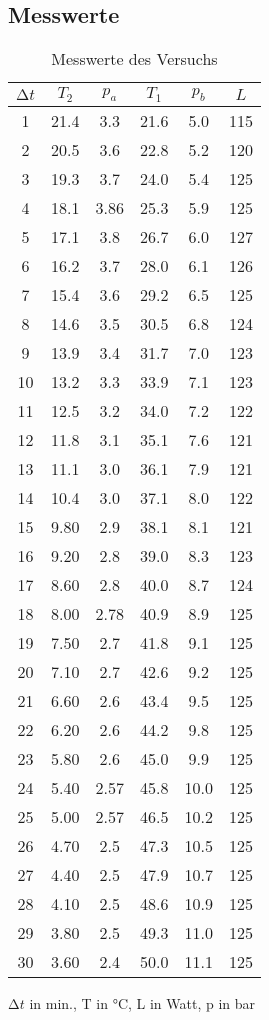 \newpage

\subsection{Messwerte}

\begin{table}
  \caption{Messwerte des Versuchs}
  \begin{tabular}{c c c c c c}
    \toprule $\increment t$ & $T_2$ & $p_a$ & $T_1$ & $p_b$ & $L$ \\
    \midrule
     1 & 21.4 & 3.3 & 21.6 & 5.0  & 115 \\
     2 & 20.5 & 3.6 & 22.8 & 5.2  & 120 \\
     3 & 19.3 & 3.7 & 24.0 & 5.4  & 125 \\
     4 & 18.1 & 3.86& 25.3 & 5.9  & 125 \\
     5 & 17.1 & 3.8 & 26.7 & 6.0  & 127 \\
     6 & 16.2 & 3.7 & 28.0 & 6.1  & 126 \\
     7 & 15.4 & 3.6 & 29.2 & 6.5  & 125 \\
     8 & 14.6 & 3.5 & 30.5 & 6.8  & 124 \\
     9 & 13.9 & 3.4 & 31.7 & 7.0  & 123 \\
    10 & 13.2 & 3.3 & 33.9 & 7.1  & 123 \\
    11 & 12.5 & 3.2 & 34.0 & 7.2  & 122 \\
    12 & 11.8 & 3.1 & 35.1 & 7.6  & 121 \\
    13 & 11.1 & 3.0 & 36.1 & 7.9  & 121 \\
    14 & 10.4 & 3.0 & 37.1 & 8.0  & 122 \\
    15 & 9.80 & 2.9 & 38.1 & 8.1  & 121 \\
    16 & 9.20 & 2.8 & 39.0 & 8.3  & 123 \\
    17 & 8.60 & 2.8 & 40.0 & 8.7  & 124 \\
    18 & 8.00 & 2.78& 40.9 & 8.9  & 125 \\
    19 & 7.50 & 2.7 & 41.8 & 9.1  & 125 \\
    20 & 7.10 & 2.7 & 42.6 & 9.2  & 125 \\
    21 & 6.60 & 2.6 & 43.4 & 9.5  & 125 \\
    22 & 6.20 & 2.6 & 44.2 & 9.8  & 125 \\
    23 & 5.80 & 2.6 & 45.0 & 9.9  & 125 \\
    24 & 5.40 & 2.57& 45.8 & 10.0 & 125 \\
    25 & 5.00 & 2.57& 46.5 & 10.2 & 125 \\
    26 & 4.70 & 2.5 & 47.3 & 10.5 & 125 \\
    27 & 4.40 & 2.5 & 47.9 & 10.7 & 125 \\
    28 & 4.10 & 2.5 & 48.6 & 10.9 & 125 \\
    29 & 3.80 & 2.5 & 49.3 & 11.0 & 125 \\
    30 & 3.60 & 2.4 & 50.0 & 11.1 & 125 \\
    \bottomrule
  \end{tabular}
\end{table}

$\increment t$ in min., T in °C, L in Watt, p in bar






